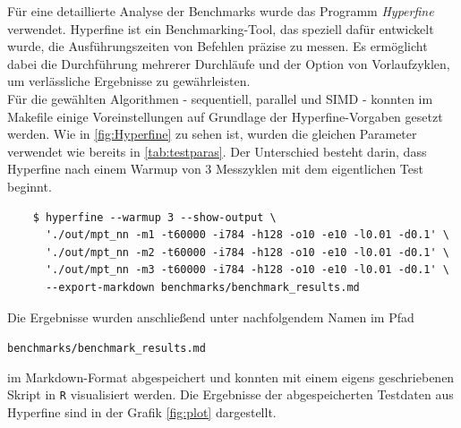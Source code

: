 \documentclass[a4paper, 12pt]{article}
\begin{document}
Für eine detaillierte Analyse der Benchmarks wurde das Programm \textit{Hyperfine} verwendet. 
Hyperfine ist ein Benchmarking-Tool, das speziell dafür entwickelt wurde, die Ausführungszeiten 
von Befehlen präzise zu messen. Es ermöglicht dabei die Durchführung mehrerer Durchläufe und der Option
von Vorlaufzyklen, um verlässliche Ergebnisse zu gewährleisten.\\
Für die gewählten Algorithmen - sequentiell, parallel und SIMD - konnten im Makefile einige 
Voreinstellungen auf Grundlage der Hyperfine-Vorgaben gesetzt werden. Wie in 
\autoref{fig:Hyperfine} zu sehen ist, wurden die gleichen Parameter verwendet wie bereits in 
\autoref{tab:testparas}. Der Unterschied besteht darin, dass Hyperfine nach einem 
Warmup von 3 Messzyklen mit dem eigentlichen Test beginnt.\\

\begin{tcolorbox}[colback=white!5!white, colframe=black!75!black, width=\textwidth]
	\small
	\begin{verbatim}
	$ hyperfine --warmup 3 --show-output \
	  './out/mpt_nn -m1 -t60000 -i784 -h128 -o10 -e10 -l0.01 -d0.1' \
	  './out/mpt_nn -m2 -t60000 -i784 -h128 -o10 -e10 -l0.01 -d0.1' \
	  './out/mpt_nn -m3 -t60000 -i784 -h128 -o10 -e10 -l0.01 -d0.1' \
	  --export-markdown benchmarks/benchmark_results.md
	\end{verbatim}
\end{tcolorbox}
\captionof{figure}{Makefile Hyperfineskript}
\label{fig:Hyperfine}
	
Die Ergebnisse wurden anschließend unter nachfolgendem Namen im Pfad

\begin{center}
	\texttt{benchmarks/benchmark\_results.md}
\end{center}
	
im Markdown-Format abgespeichert und konnten mit einem eigens geschriebenen Skript 
in \texttt{R} visualisiert werden. Die Ergebnisse der abgespeicherten Testdaten aus Hyperfine sind 
in der Grafik \autoref{fig:plot} dargestellt.

\newpage %
\end{document}
